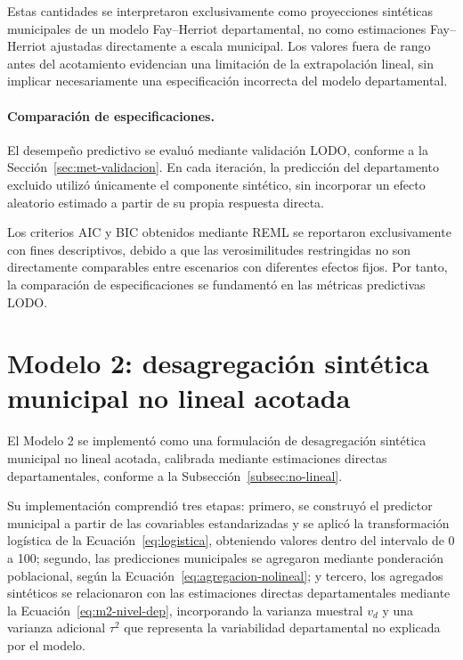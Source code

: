 Estas cantidades se interpretaron exclusivamente como proyecciones sintéticas municipales de un modelo Fay--Herriot departamental, no como estimaciones Fay--Herriot ajustadas directamente a escala municipal. Los valores fuera de rango antes del acotamiento evidencian una limitación de la extrapolación lineal, sin implicar necesariamente una especificación incorrecta del modelo departamental.

\paragraph{Comparación de especificaciones.}

El desempeño predictivo se evaluó mediante validación LODO, conforme a la Sección~\ref{sec:met-validacion}. En cada iteración, la predicción del departamento excluido utilizó únicamente el componente sintético, sin incorporar un efecto aleatorio estimado a partir de su propia respuesta directa.

Los criterios AIC y BIC obtenidos mediante REML se reportaron exclusivamente con fines descriptivos, debido a que las verosimilitudes restringidas no son directamente comparables entre escenarios con diferentes efectos fijos. Por tanto, la comparación de especificaciones se fundamentó en las métricas predictivas LODO.



\section{Modelo 2: desagregación sintética municipal no lineal acotada}
\label{sec:met-m2}

El Modelo 2 se implementó como una formulación de desagregación sintética municipal no lineal acotada, calibrada mediante estimaciones directas departamentales, conforme a la Subsección~\ref{subsec:no-lineal}.

Su implementación comprendió tres etapas: primero, se construyó el predictor municipal a partir de las covariables estandarizadas y se aplicó la transformación logística de la Ecuación~\ref{eq:logistica}, obteniendo valores dentro del intervalo de 0 a 100; segundo, las predicciones municipales se agregaron mediante ponderación poblacional, según la Ecuación~\ref{eq:agregacion-nolineal}; y tercero, los agregados sintéticos se relacionaron con las estimaciones directas departamentales mediante la Ecuación~\ref{eq:m2-nivel-dep}, incorporando la varianza muestral $v_d$ y una varianza adicional $\tau^2$ que representa la variabilidad departamental no explicada por el modelo.

